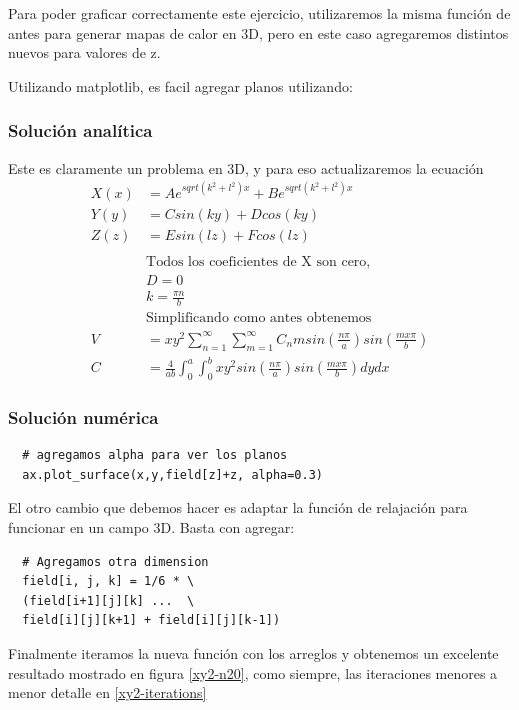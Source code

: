 \documentclass[10pt,journal,compsoc]{IEEEtran}
\begin{document}
Para poder graficar correctamente este ejercicio, utilizaremos la misma función de antes para
generar mapas de calor en 3D, pero en este caso agregaremos distintos nuevos para valores de z.

Utilizando matplotlib, es facil agregar planos utilizando:
\subsubsection{Solución analítica}

Este es claramente un problema en 3D, y para eso actualizaremos la ecuación
\begin{align*}
  X(x) &= Ae^{sqrt(k^2+l^2)x} + Be^{sqrt(k^2+l^2)x}\\
  Y(y) &= C sin(ky) + D cos(ky)\\
  Z(z) &= E sin (lz) + F cos(lz)\\
  \\
  &\text{Todos los coeficientes de X son cero,}\\
  &D = 0\\
  &k = \frac{\pi n}{b}\\
  &\text{Simplificando como antes obtenemos}\\
  V &= xy^2 \sum_{n=1}^{\infty} \sum_{m=1}^{\infty} C_nm sin(\frac{n \pi}{a})sin(\frac{m x\pi}{b})\\
  C &= \frac{4}{ab} \int_0^a \int_0^b xy^2 sin(\frac{n \pi}{a})sin(\frac{m x\pi}{b}) dydx
\end{align*}


\subsubsection{Solución numérica}
\begin{lstlisting}
  # agregamos alpha para ver los planos
  ax.plot_surface(x,y,field[z]+z, alpha=0.3)
\end{lstlisting}

El otro cambio que debemos hacer es adaptar la función de relajación para funcionar en un campo 3D.
Basta con agregar:
\begin{lstlisting}
  # Agregamos otra dimension
  field[i, j, k] = 1/6 * \
  (field[i+1][j][k] ...  \
  field[i][j][k+1] + field[i][j][k-1])
\end{lstlisting}

Finalmente iteramos la nueva función con los arreglos y obtenemos un excelente resultado mostrado en 
figura \ref{xy2-n20}, como siempre, las iteraciones menores a menor detalle en \ref{xy2-iterations}
\end{document}
